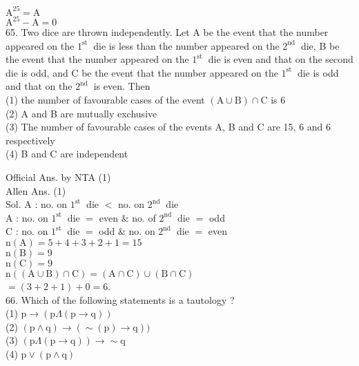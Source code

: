 \documentclass[10pt]{article}
\begin{document}
\(\mathrm{A}^{25}=\mathrm{A}\)\\
\(\mathrm{A}^{25}-\mathrm{A}=0\)\\
65. Two dice are thrown independently. Let A be the event that the number appeared on the \(1^{\text {st }}\) die is less than the number appeared on the \(2^{\text {nd }}\) die, B be the event that the number appeared on the \(1^{\text {st }}\) die is even and that on the second die is odd, and C be the event that the number appeared on the \(1^{\text {st }}\) die is odd and that on the \(2^{\text {nd }}\) is even. Then\\
(1) the number of favourable cases of the event \((\mathrm{A} \cup \mathrm{B}) \cap \mathrm{C}\) is 6\\
(2) A and B are mutually exchusive\\
(3) The number of favourable cases of the events A, B and C are 15, 6 and 6 respectively\\
(4) B and C are independent

Official Ans. by NTA (1)\\
Allen Ans. (1)\\
Sol. A : no. on \(1^{\text {st }}\) die \(<\) no. on \(2^{\text {nd }}\) die\\
A : no. on \(1^{\text {st }}\) die \(=\) even \(\&\) no. of \(2^{\text {nd }}\) die \(=\) odd\\
C : no. on \(1^{\text {st }}\) die \(=\) odd \(\&\) no. on \(2^{\text {nd }}\) die \(=\) even\\
\(\mathrm{n}(\mathrm{A})=5+4+3+2+1=15\)\\
\(\mathrm{n}(\mathrm{B})=9\)\\
\(\mathrm{n}(\mathrm{C})=9\)\\
\(\mathrm{n}((\mathrm{A} \cup \mathrm{B}) \cap \mathrm{C})=(\mathrm{A} \cap \mathrm{C}) \cup(\mathrm{B} \cap \mathrm{C})\)\\
\(=(3+2+1)+0=6\).\\
66. Which of the following statements is a tautology ?\\
(1) \(\mathrm{p} \rightarrow(\mathrm{p} \Lambda(\mathrm{p} \rightarrow \mathrm{q}))\)\\
(2) \((\mathrm{p} \wedge \mathrm{q}) \rightarrow(\sim(\mathrm{p}) \rightarrow \mathrm{q}))\)\\
(3) \((\mathrm{p} \Lambda(\mathrm{p} \rightarrow \mathrm{q})) \rightarrow \sim \mathrm{q}\)\\
(4) \(\mathrm{p} \vee(\mathrm{p} \wedge \mathrm{q})\)
\end{document}
